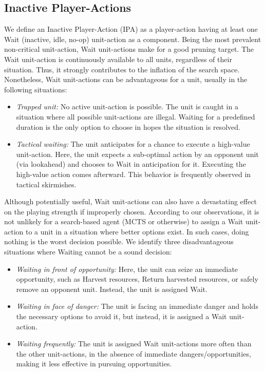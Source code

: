 \documentclass[conference]{IEEEtran}
\begin{document}

\subsection{Inactive Player-Actions}

We define an Inactive Player-Action (IPA) as a player-action having at least one Wait (inactive, idle, no-op) unit-action as a component. Being the most prevalent non-critical unit-action, Wait unit-actions make for a good pruning target. The Wait unit-action is continuously available to all units, regardless of their situation. Thus, it strongly contributes to the inflation of the search space. Nonetheless, Wait unit-actions can be advantageous for a unit, usually in the following situations:

\begin{itemize}
\item \textit{Trapped unit:} No active unit-action is possible. The unit is caught in a situation where all possible unit-actions are illegal. Waiting for a predefined duration is the only option to choose in hopes the situation is resolved.
\item \textit{Tactical waiting:} The unit anticipates for a chance to execute a high-value unit-action. Here, the unit expects a sub-optimal action by an opponent unit (via lookahead) and chooses to Wait in anticipation for it. Executing the high-value action comes afterward. This behavior is frequently observed in tactical skirmishes.
\end{itemize}

Although potentially useful, Wait unit-actions can also have a devastating effect on the playing strength if improperly chosen. According to our observations, it is not unlikely for a search-based agent (MCTS or otherwise) to assign a Wait unit-action to a unit in a situation where better options exist. In such cases, doing nothing is the worst decision possible. We identify three disadvantageous situations where Waiting cannot be a sound decision:

\begin{itemize}
\item \textit{Waiting in front of opportunity:} Here, the unit can seize an immediate opportunity, such as Harvest resources, Return harvested resources, or safely remove an opponent unit. Instead, the unit is assigned Wait.
\item \textit{Waiting in face of danger:} The unit is facing an immediate danger and holds the necessary options to avoid it, but instead, it is assigned a Wait unit-action.
\item \textit{Waiting frequently:} The unit is assigned Wait unit-actions more often than the other unit-actions, in the absence of immediate dangers/opportunities, making it less effective in pursuing opportunities.
\end{itemize}
\end{document}
